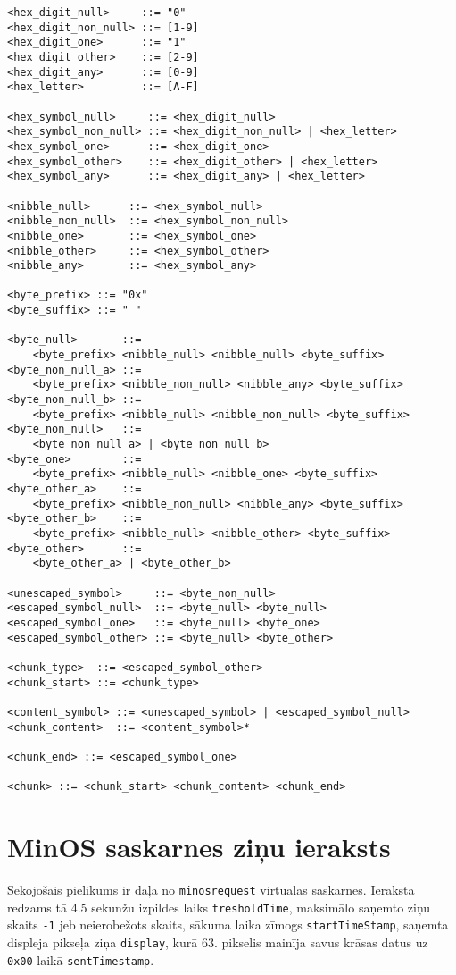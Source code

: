 \begin{lstlisting}
<hex_digit_null>     ::= "0"
<hex_digit_non_null> ::= [1-9]
<hex_digit_one>      ::= "1"
<hex_digit_other>    ::= [2-9]
<hex_digit_any>      ::= [0-9]
<hex_letter>         ::= [A-F]

<hex_symbol_null>     ::= <hex_digit_null>
<hex_symbol_non_null> ::= <hex_digit_non_null> | <hex_letter>
<hex_symbol_one>      ::= <hex_digit_one>
<hex_symbol_other>    ::= <hex_digit_other> | <hex_letter>
<hex_symbol_any>      ::= <hex_digit_any> | <hex_letter>

<nibble_null>      ::= <hex_symbol_null>
<nibble_non_null>  ::= <hex_symbol_non_null>
<nibble_one>       ::= <hex_symbol_one>
<nibble_other>     ::= <hex_symbol_other>
<nibble_any>       ::= <hex_symbol_any>

<byte_prefix> ::= "0x"
<byte_suffix> ::= " "

<byte_null>       ::= 
    <byte_prefix> <nibble_null> <nibble_null> <byte_suffix>
<byte_non_null_a> ::= 
    <byte_prefix> <nibble_non_null> <nibble_any> <byte_suffix>
<byte_non_null_b> ::= 
    <byte_prefix> <nibble_null> <nibble_non_null> <byte_suffix>
<byte_non_null>   ::= 
    <byte_non_null_a> | <byte_non_null_b>
<byte_one>        ::= 
    <byte_prefix> <nibble_null> <nibble_one> <byte_suffix>
<byte_other_a>    ::= 
    <byte_prefix> <nibble_non_null> <nibble_any> <byte_suffix>
<byte_other_b>    ::= 
    <byte_prefix> <nibble_null> <nibble_other> <byte_suffix>
<byte_other>      ::= 
    <byte_other_a> | <byte_other_b>

<unescaped_symbol>     ::= <byte_non_null>
<escaped_symbol_null>  ::= <byte_null> <byte_null>
<escaped_symbol_one>   ::= <byte_null> <byte_one>
<escaped_symbol_other> ::= <byte_null> <byte_other>

<chunk_type>  ::= <escaped_symbol_other>
<chunk_start> ::= <chunk_type>

<content_symbol> ::= <unescaped_symbol> | <escaped_symbol_null>
<chunk_content>  ::= <content_symbol>*

<chunk_end> ::= <escaped_symbol_one>

<chunk> ::= <chunk_start> <chunk_content> <chunk_end>
\end{lstlisting}

\section{MinOS saskarnes ziņu ieraksts}
\label{att:minosrequest}

Sekojošais pielikums ir daļa no \lstinline!minosrequest! virtuālās saskarnes.
Ierakstā redzams tā 4.5 sekunžu izpildes laiks \lstinline!tresholdTime!,
maksimālo saņemto ziņu skaits \lstinline!-1! jeb neierobežots skaits, sākuma
laika zīmogs \lstinline!startTimeStamp!, saņemta displeja pikseļa ziņa
\lstinline!display!, kurā 63. pikselis mainīja savus krāsas datus uz
\lstinline!0x00! laikā \lstinline!sentTimestamp!.


